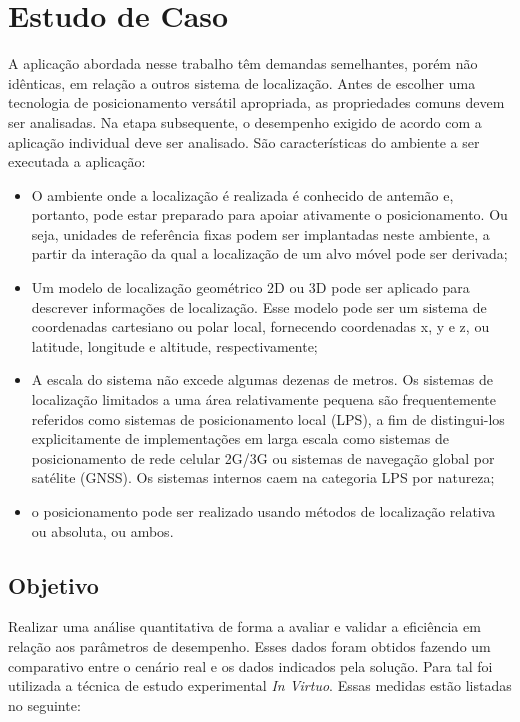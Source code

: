 \section{Estudo de Caso}\label{sec:estudo-de-caso}

A aplicação abordada nesse trabalho têm demandas semelhantes, porém não idênticas, em relação a outros sistema de localização. Antes de escolher uma tecnologia de posicionamento versátil apropriada, as propriedades comuns devem ser analisadas. Na etapa subsequente, o desempenho exigido de acordo com a aplicação individual deve ser analisado. São características do ambiente a ser executada a aplicação:

\begin{itemize}
    \item O ambiente onde a localização é realizada é conhecido de antemão e, portanto, pode estar preparado para apoiar ativamente o posicionamento. Ou seja, unidades de referência fixas podem ser implantadas neste ambiente, a partir da interação da qual a localização de um alvo móvel pode ser derivada; 
    \item Um modelo de localização geométrico 2D ou 3D pode ser aplicado para descrever informações de localização. Esse modelo pode ser um sistema de coordenadas cartesiano ou polar local, fornecendo coordenadas x, y e z, ou latitude, longitude e altitude, respectivamente;
    \item A escala do sistema não excede algumas dezenas de metros. Os sistemas de localização limitados a uma área relativamente pequena são frequentemente referidos como sistemas de posicionamento local (LPS), a fim de distingui-los explicitamente de implementações em larga escala como sistemas de posicionamento de rede celular 2G/3G ou sistemas de navegação global por satélite (GNSS). Os sistemas internos caem na categoria LPS por natureza;
    \item o posicionamento pode ser realizado usando métodos de localização relativa ou absoluta, ou ambos.
\end{itemize} 

\subsection{Objetivo}
Realizar uma análise quantitativa de forma a avaliar e validar a eficiência em relação aos parâmetros de desempenho. Esses dados foram obtidos fazendo um comparativo entre o cenário real e os dados indicados pela solução. Para tal foi utilizada a técnica de estudo experimental \textit{In Virtuo}. Essas medidas estão listadas no seguinte: 

